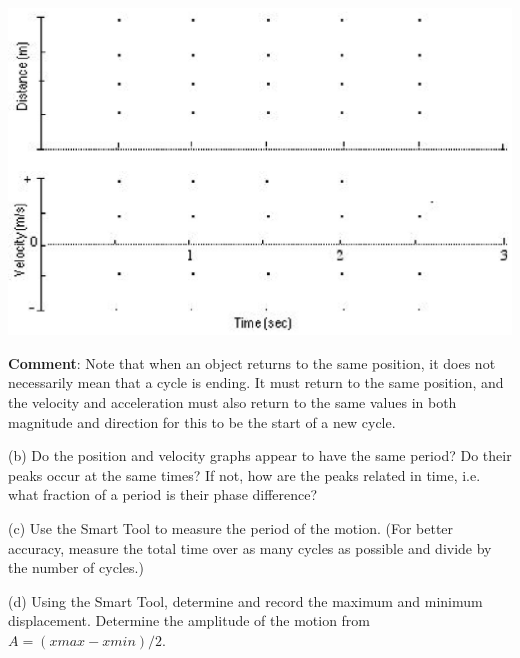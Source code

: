 \vspace{0.3cm}
{\par\centering \includegraphics{periodic_motion/periodic_motion_fig1.eps} \par}
\vspace{0.3cm}

\textbf{Comment}: Note that when an object returns to the same position, it 
does not necessarily mean that a cycle is ending. It must return to the same 
position, and the velocity and acceleration must also return to the same 
values in both magnitude and direction for this to be the start of a new cycle. 


(b) Do the position and velocity graphs appear to have the same period? Do their
peaks occur at the same times? If not, how are the peaks related in time, i.e. 
what fraction of a period is their phase difference?
\vspace{20mm}

(c) Use the Smart Tool to measure the period of the motion. (For
better accuracy, measure the total time over as many cycles as possible and
divide by the number of cycles.)
\vspace{20mm}

(d) Using the Smart Tool, determine and record the maximum and minimum 
displacement.  Determine the amplitude of the motion from $A = (xmax - xmin)/2$.
\vspace{30mm}

